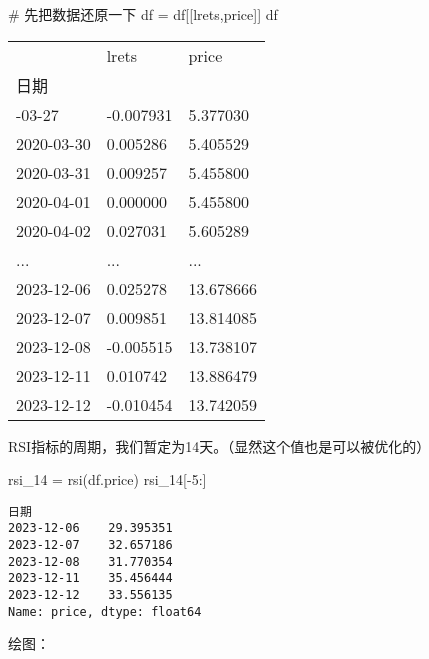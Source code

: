 \documentclass[
  letterpaper,
  DIV=11,
  numbers=noendperiod]{scrreprt}
\newenvironment{Shaded}{\begin{snugshade}}{\end{snugshade}}
\newcommand{\CommentTok}[1]{\textcolor[rgb]{0.37,0.37,0.37}{#1}}
\newcommand{\DecValTok}[1]{\textcolor[rgb]{0.68,0.00,0.00}{#1}}
\newcommand{\NormalTok}[1]{\textcolor[rgb]{0.00,0.23,0.31}{#1}}
\newcommand{\OperatorTok}[1]{\textcolor[rgb]{0.37,0.37,0.37}{#1}}
\newcommand{\StringTok}[1]{\textcolor[rgb]{0.13,0.47,0.30}{#1}}
\begin{document}
\begin{Shaded}
\begin{Highlighting}[]
\CommentTok{\# 先把数据还原一下}
\NormalTok{df }\OperatorTok{=}\NormalTok{ df[[}\StringTok{\textquotesingle{}lrets\textquotesingle{}}\NormalTok{,}\StringTok{\textquotesingle{}price\textquotesingle{}}\NormalTok{]]}
\NormalTok{df}
\end{Highlighting}
\end{Shaded}

\begin{longtable}[]{@{}lll@{}}
\toprule\noalign{}
& lrets & price \\
日期 & & \\
\midrule\noalign{}
\endhead
\bottomrule\noalign{}
\endlastfoot
2020-03-27 & -0.007931 & 5.377030 \\
2020-03-30 & 0.005286 & 5.405529 \\
2020-03-31 & 0.009257 & 5.455800 \\
2020-04-01 & 0.000000 & 5.455800 \\
2020-04-02 & 0.027031 & 5.605289 \\
... & ... & ... \\
2023-12-06 & 0.025278 & 13.678666 \\
2023-12-07 & 0.009851 & 13.814085 \\
2023-12-08 & -0.005515 & 13.738107 \\
2023-12-11 & 0.010742 & 13.886479 \\
2023-12-12 & -0.010454 & 13.742059 \\
\end{longtable}

RSI指标的周期，我们暂定为14天。（显然这个值也是可以被优化的）

\begin{Shaded}
\begin{Highlighting}[]
\NormalTok{rsi\_14 }\OperatorTok{=}\NormalTok{ rsi(df.price)}
\NormalTok{rsi\_14[}\OperatorTok{{-}}\DecValTok{5}\NormalTok{:]}
\end{Highlighting}
\end{Shaded}

\begin{verbatim}
日期
2023-12-06    29.395351
2023-12-07    32.657186
2023-12-08    31.770354
2023-12-11    35.456444
2023-12-12    33.556135
Name: price, dtype: float64
\end{verbatim}

绘图：
\end{document}
